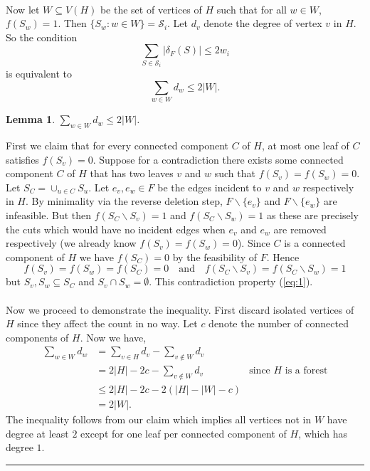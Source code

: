 \documentclass[letterpaper,12pt,oneside,onecolumn]{article}
\newcommand{\cS}{\mathcal{S}} \newcommand{\cT}{\mathcal{T}}
\newenvironment{proof}{{\bf Proof:  }}{\hfill\rule{2mm}{2mm}}
\newtheorem{lemma}[fact]{Lemma}
\begin{document}
\paragraph{}
Now let $W\subseteq V(H)$ be the set of vertices of $H$ such that for all $w \in W$, $f(S_w) = 1$. Then $\{S_w : w\in W\} = \cS_i$. Let $d_v$ denote the degree of vertex $v$ in $H$. So the condition
$$\sum_{S \in \cS_i} |\delta_F(S)| \leq 2w_i$$
is equivalent to
$$\sum_{w \in W} d_w \leq 2|W|.$$
\begin{lemma}\label{lemma:leaves}
$\sum_{w\in W} d_w \leq 2|W|$.
\end{lemma}
\begin{proof}
First we claim that for every connected component $C$ of $H$, at most one leaf of $C$ satisfies $f(S_v) = 0$. Suppose for a contradiction there exists some connected component $C$ of $H$ that has two leaves $v$ and $w$ such that $f(S_v) = f(S_w) = 0$. Let $S_C = \cup_{u\in C} S_u$. Let $e_v, e_w \in F$ be the edges incident to $v$ and $w$ respectively in $H$. By minimality via the reverse deletion step, $F\backslash \{e_v\}$ and $F\backslash \{e_w\}$ are infeasible. But then $f(S_C\backslash S_v) =1 $ and $f(S_C\backslash S_w) = 1$ as these are precisely the cuts which would have no incident edges when $e_v$ and $e_w$ are removed respectively (we already know $f(S_v) = f(S_w) = 0$). Since $C$ is a connected component of $H$ we have $f(S_C) = 0$ by the feasibility of $F$. Hence
$$f(S_v) = f(S_w) = f(S_C) = 0 \quad\text{and}\quad f(S_C\backslash S_v) = f(S_C \backslash S_w) = 1$$
but $S_v, S_w \subseteq S_C$ and $S_v \cap S_w = \emptyset$. This contradiction property (\ref{eq:1}).
\paragraph{}
Now we proceed to demonstrate the inequality. First discard isolated vertices of $H$ since they affect the count in no way. Let $c$ denote the number of connected components of $H$. Now we have,
\begin{align*}
\sum_{w\in W} d_w &= \sum_{v \in H} d_v - \sum_{v\not\in W} d_v \\
&= 2|H| -2c - \sum_{v\not\in W} d_v &\text{since $H$ is a forest} \\
&\leq 2|H| - 2c - 2(|H| - |W| - c) \\
&= 2|W|.
\end{align*}
The inequality follows from our claim which implies all vertices not in $W$ have degree at least $2$ except for one leaf per connected component of $H$, which has degree $1$.
\end{proof}
\end{document}
